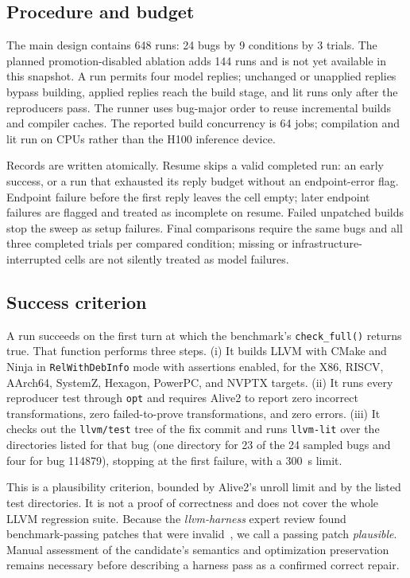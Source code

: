\documentclass[conference]{IEEEtran}
\begin{document}
\subsection{Procedure and budget}

The main design contains 648 runs: 24 bugs by 9 conditions by 3 trials. The planned promotion-disabled ablation adds 144 runs and is not yet available in this snapshot. A run permits four model replies; unchanged or unapplied replies bypass building, applied replies reach the build stage, and lit runs only after the reproducers pass. The runner uses bug-major order to reuse incremental builds and compiler caches. The reported build concurrency is 64 jobs; compilation and lit run on CPUs rather than the H100 inference device.

Records are written atomically. Resume skips a valid completed run: an early success, or a run that exhausted its reply budget without an endpoint-error flag. Endpoint failure before the first reply leaves the cell empty; later endpoint failures are flagged and treated as incomplete on resume. Failed unpatched builds stop the sweep as setup failures. Final comparisons require the same bugs and all three completed trials per compared condition; missing or infrastructure-interrupted cells are not silently treated as model failures.

\subsection{Success criterion}
\label{sec:success}

A run succeeds on the first turn at which the benchmark's \texttt{check\_full()} returns true. That function performs three steps. (i) It builds LLVM with CMake and Ninja in \texttt{RelWithDebInfo} mode with assertions enabled, for the X86, RISCV, AArch64, SystemZ, Hexagon, PowerPC, and NVPTX targets. (ii) It runs every reproducer test through \texttt{opt} and requires Alive2 to report zero incorrect transformations, zero failed-to-prove transformations, and zero errors. (iii) It checks out the \texttt{llvm/test} tree of the fix commit and runs \texttt{llvm-lit} over the directories listed for that bug (one directory for 23 of the 24 sampled bugs and four for bug 114879), stopping at the first failure, with a 300~s limit.

This is a plausibility criterion, bounded by Alive2's unroll limit and by the listed test directories. It is not a proof of correctness and does not cover the whole LLVM regression suite. Because the \emph{llvm-harness} expert review found benchmark-passing patches that were invalid~\cite{zheng2026harness}, we call a passing patch \emph{plausible}. Manual assessment of the candidate's semantics and optimization preservation remains necessary before describing a harness pass as a confirmed correct repair.
\end{document}
